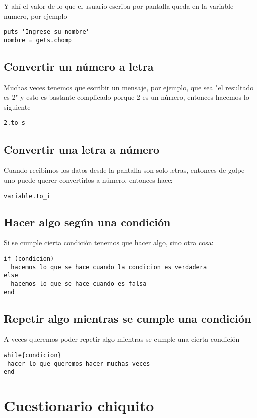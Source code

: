 Y ahí el valor de lo que el usuario escriba por pantalla queda en la variable numero, por ejemplo

\begin{lstlisting}
puts 'Ingrese su nombre'
nombre = gets.chomp
\end{lstlisting}
\subsection{Convertir un número a letra}
Muchas veces tenemos que escribir un mensaje, por ejemplo, que sea "el resultado es 2" y esto es bastante complicado porque 2 es un número, entonces hacemos lo siguiente

\begin{lstlisting}
2.to_s
\end{lstlisting}

\subsection{Convertir una letra a número}
Cuando recibimos los datos desde la pantalla son solo letras, entonces de golpe uno puede querer convertirlos a número, entonces hace:

\begin{lstlisting}
variable.to_i
\end{lstlisting}

\subsection{Hacer algo según una condición}
Si se cumple cierta condición tenemos que hacer algo, sino otra cosa:

\begin{lstlisting}
if (condicion)
  hacemos lo que se hace cuando la condicion es verdadera 
else
  hacemos lo que se hace cuando es falsa
end
\end{lstlisting}

\subsection{Repetir algo mientras se cumple una condición}
A veces queremos poder repetir algo mientras se cumple una cierta condición

\begin{lstlisting}
while{condicion}
 hacer lo que queremos hacer muchas veces
end
\end{lstlisting}

\section{Cuestionario chiquito}

